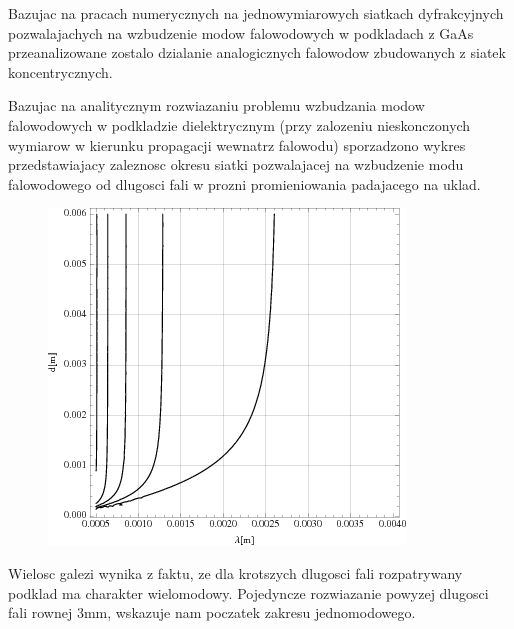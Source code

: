 Bazujac na pracach numerycznych na jednowymiarowych siatkach dyfrakcyjnych pozwalajachych na wzbudzenie modow falowodowych w podkladach z GaAs przeanalizowane zostalo dzialanie analogicznych falowodow zbudowanych z siatek koncentrycznych. 

Bazujac na analitycznym rozwiazaniu problemu wzbudzania modow falowodowych w podkladzie dielektrycznym (przy zalozeniu nieskonczonych wymiarow w kierunku propagacji wewnatrz falowodu) sporzadzono wykres przedstawiajacy zaleznosc okresu siatki pozwalajacej na wzbudzenie modu falowodowego od dlugosci fali w prozni promieniowania padajacego na uklad.

\begin{figure}
\includegraphics{images/antenaThz/d_lambda.png}
\end{figure}

Wielosc galezi wynika z faktu, ze dla krotszych dlugosci fali rozpatrywany podklad ma charakter wielomodowy. Pojedyncze rozwiazanie powyzej dlugosci fali rownej 3mm, wskazuje nam poczatek zakresu jednomodowego.

